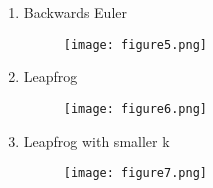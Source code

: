 \documentclass{article}
\begin{document}
\begin{enumerate}
\begin{enumerate}
\item 
Backwards Euler
		\begin{figure}[H]
		\texttt{[image: figure5.png]}
		\end{figure}
\item
Leapfrog
		\begin{figure}[H]
		\texttt{[image: figure6.png]}
		\end{figure}
\item
Leapfrog with smaller k
		\begin{figure}[H]
		\texttt{[image: figure7.png]}
		\end{figure}
\end{enumerate}
\end{enumerate}
\end{document}
